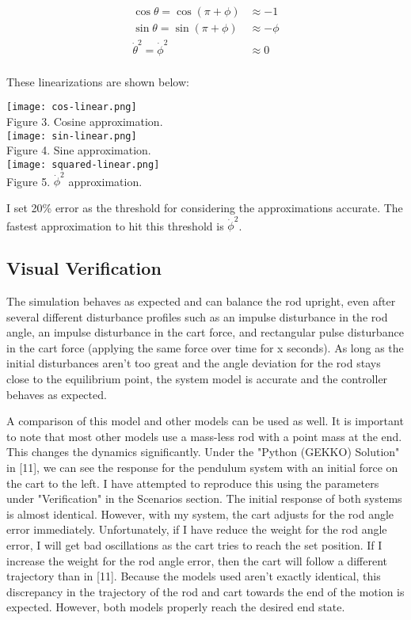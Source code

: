 \documentclass{article}
\begin{document}
\begin{align}
    \cos{\theta} = \cos{(\pi + \phi)} &\approx -1 \\
    \sin{\theta} = \sin{(\pi + \phi)} &\approx -\phi \\
    \Dot{\theta}^2 = \Dot{\phi}^2 &\approx 0 \\
\end{align}

\noindent These linearizations are shown below:
\vspace{5mm}

\begin{center}
    \texttt{[image: cos-linear.png]}\\
    Figure 3. Cosine approximation. \\
    \texttt{[image: sin-linear.png]} \\
    Figure 4. Sine approximation. \\
        \vspace{8mm}
    \texttt{[image: squared-linear.png]} \\
    Figure 5. $\Dot{\phi}^2$ approximation. \\
\end{center}

I set 20\% error as the threshold for considering the approximations accurate. The fastest approximation to hit this threshold is  $\Dot{\phi}^2$.

\subsection{Visual Verification}

The simulation behaves as expected and can balance the rod upright, even after several different disturbance profiles such as an impulse disturbance in the rod angle, an impulse disturbance in the cart force, and rectangular pulse disturbance in the cart force (applying the same force over time for x seconds). As long as the initial disturbances aren't too great and the angle deviation for the rod stays close to the equilibrium point, the system model is accurate and the controller behaves as expected.

A comparison of this model and other models can be used as well. It is important to note that most other models use a mass-less rod with a point mass at the end. This changes the dynamics significantly. Under the "Python (GEKKO) Solution" in [11], we can see the response for the pendulum system with an initial force on the cart to the left. I have attempted to reproduce this using the parameters under "Verification" in the Scenarios section. The initial response of both systems is almost identical. However, with my system, the cart adjusts for the rod angle error immediately. Unfortunately, if I have reduce the weight for the rod angle error, I will get bad oscillations as the cart tries to reach the set position. If I increase the weight for the rod angle error, then the cart will follow a different trajectory than in [11]. Because the models used aren't exactly identical, this discrepancy in the trajectory of the rod and cart towards the end of the motion is expected. However, both models properly reach the desired end state.
\end{document}
